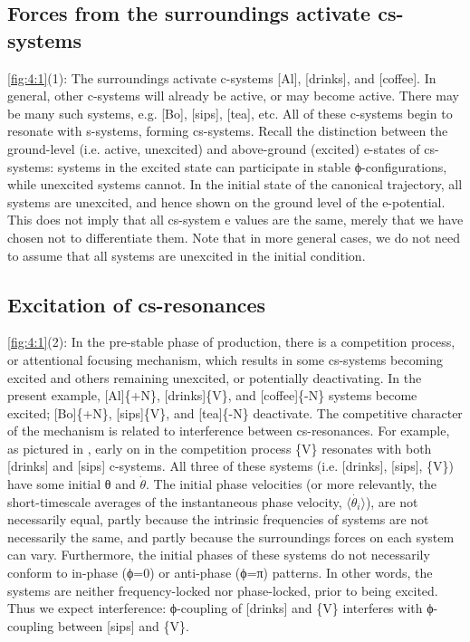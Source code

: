\subsection{Forces from the surroundings activate cs-systems} 

\ref{fig:4:1}(1): The surroundings activate c-systems [Al], [drinks], and [coffee]. In general, other c-systems will already be active, or may become active. There may be many such systems, e.g. [Bo], [sips], [tea], etc. All of these c-systems begin to resonate with s-systems, forming cs-systems. Recall the distinction between the ground-level (i.e. active, unexcited) and above-ground (excited) e-states of cs-systems: systems in the excited state can participate in stable ϕ-configurations, while unexcited systems cannot. In the initial state of the canonical trajectory, all systems are unexcited, and hence shown on the ground level of the e-potential. This does not imply that all cs-system e values are the same, merely that we have chosen not to differentiate them. Note that in more general cases, we do not need to assume that all systems are unexcited in the initial condition.

\subsection{Excitation of cs-resonances}

\ref{fig:4:1}(2): In the pre-stable phase of production, there is a competition process, or attentional focusing mechanism, which results in some cs-systems becoming excited and others remaining unexcited, or potentially deactivating. In the present example, [Al]\{+N\}, [drinks]\{V\}, and [coffee]\{-N\} systems become excited; [Bo]\{+N\}, [sips]\{V\}, and [tea]\{-N\} deactivate. The competitive character of the mechanism is related to interference between cs-resonances. For example, as pictured in {}, early on in the competition process \{V\} resonates with both [drinks] and [sips] c-systems. All three of these systems (i.e. [drinks], [sips], \{V\}) have some initial θ and $\dot{\theta} $. The initial phase velocities (or more relevantly, the short-timescale averages of the instantaneous phase velocity, $\langle\dot{\theta_i}\rangle$), are not necessarily equal, partly because the intrinsic frequencies of systems are not necessarily the same, and partly because the surroundings forces on each system can vary. Furthermore, the initial phases of these systems do not necessarily conform to in-phase (ϕ=0) or anti-phase (ϕ=π) patterns. In other words, the systems are neither frequency-locked nor phase-locked, prior to being excited. Thus we expect interference: ϕ{}-coupling of [drinks] and \{V\} interferes with ϕ{}-coupling between [sips] and \{V\}.

